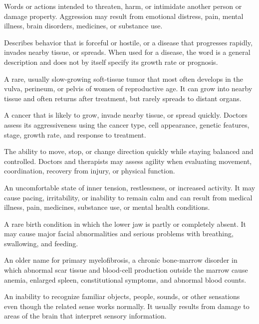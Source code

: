  Words or actions intended to threaten, harm, or intimidate another person or damage property. Aggression may result from emotional distress, pain, mental illness, brain disorders, medicines, or substance use.

 Describes behavior that is forceful or hostile, or a disease that progresses rapidly, invades nearby tissue, or spreads. When used for a disease, the word is a general description and does not by itself specify its growth rate or prognosis.

 A rare, usually slow-growing soft-tissue tumor that most often develops in the vulva, perineum, or pelvis of women of reproductive age. It can grow into nearby tissue and often returns after treatment, but rarely spreads to distant organs.

 A cancer that is likely to grow, invade nearby tissue, or spread quickly. Doctors assess its aggressiveness using the cancer type, cell appearance, genetic features, stage, growth rate, and response to treatment.

 The ability to move, stop, or change direction quickly while staying balanced and controlled. Doctors and therapists may assess agility when evaluating movement, coordination, recovery from injury, or physical function.

 An uncomfortable state of inner tension, restlessness, or increased activity. It may cause pacing, irritability, or inability to remain calm and can result from medical illness, pain, medicines, substance use, or mental health conditions.

 A rare birth condition in which the lower jaw is partly or completely absent. It may cause major facial abnormalities and serious problems with breathing, swallowing, and feeding.

 An older name for primary myelofibrosis, a chronic bone-marrow disorder in which abnormal scar tissue and blood-cell production outside the marrow cause anemia, enlarged spleen, constitutional symptoms, and abnormal blood counts.

 An inability to recognize familiar objects, people, sounds, or other sensations even though the related sense works normally. It usually results from damage to areas of the brain that interpret sensory information.

